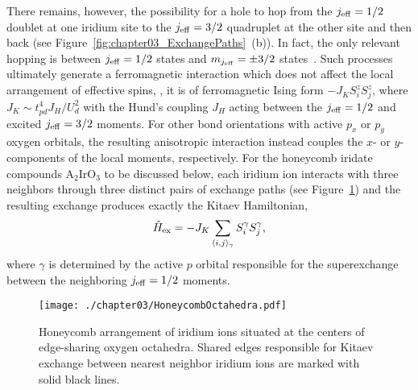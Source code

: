 There remains, however, the possibility for a hole to hop from the $j_{\rm eff} = 1/2$ doublet at one iridium site to the $j_{\rm eff} = 3/2$ quadruplet at the other site and then back (see Figure~\ref{fig:chapter03_ExchangePaths}~(b)).
In fact, the only relevant hopping is between $j_{\rm eff} = 1/2$ states and $m_{j_{\rm eff}} = \pm 3/2$ states~\cite{WinterJOP2017}.
Such processes ultimately generate a ferromagnetic interaction which does not affect the local arrangement of effective spins, \ie, it is of ferromagnetic Ising form $-J_K S_i^z S_j^z$, where $J_K \sim t_{pd}^4 J_H / U_d^2$ with the Hund's coupling $J_H$ acting between the $j_{\rm eff} = 1/2$ and excited $j_{\rm eff} = 3/2$ moments.
For other bond orientations with active $p_x$ or $p_y$ oxygen orbitals, the resulting anisotropic interaction instead couples the $x$- or $y$-components of the local moments, respectively.
For the honeycomb iridate compounds A$_2$IrO$_3$ to be discussed below, each iridium ion interacts with three neighbors through three distinct pairs of exchange paths (see Figure~\ref{fig:chapter03_HoneycombOctahedra}) and the resulting exchange produces exactly the Kitaev Hamiltonian,
%
\begin{equation}
	\hat{H}_{\rm ex} = -J_K \sum_{\langle i,j \rangle_{\gamma}} S_i^{\gamma} S_j^{\gamma},
\end{equation}
%
where $\gamma$ is determined by the active $p$ orbital responsible for the superexchange between the neighboring $j_{\rm eff} = 1/2$ moments.
%
\begin{figure}[tb]
	\centering
	\texttt{[image: ./chapter03/HoneycombOctahedra.pdf]}
	\caption{
		Honeycomb arrangement of iridium ions situated at the centers of edge-sharing oxygen octahedra.
		Shared edges responsible for Kitaev exchange between nearest neighbor iridium ions are marked with solid black lines.
	}
	\label{fig:chapter03_HoneycombOctahedra}
\end{figure}
%


%
%
